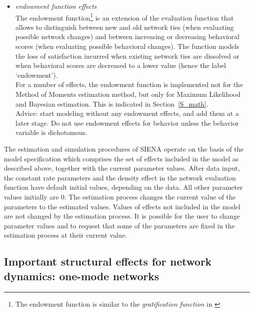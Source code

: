 \documentclass[a4paper,fleqn]{article}
\newcommand{\+}{\, + \,}
\newcommand{\SI}{{\sf SIENA }}
\begin{document}
{\begin{itemize}
density. For directed networks,
it mostly is also advisable to include the reciprocity
effect, this being one of the most fundamental network effects.
Likewise, behavior evaluation functions should normally always
contain the shape parameter, to account for the observed
prevalence of the behavior, and
(unless the behavior is dichotomous) the quadratic shape effect,
to account more precisely for the distribution of the behavior.
\item {\em endowment function effects}\\
The endowment function\footnote{The endowment function is similar to the {\it gratification
function} in \citet{Snijders01}} is an extension of the evaluation
function that allows to distinguish between new and old network
ties (when evaluating possible network changes) and between
increasing or decreasing behavioral scores (when evaluating
possible behavioral changes). The function models the loss of
satisfaction incurred when existing network ties are dissolved or
when behavioral scores
are decreased to a lower value (hence the label `endowment').\\
For a number of effects, the endowment function is implemented
not for the Method of Moments estimation method,
but only for Maximum Likelihood and Bayesian estimation.
This is indicated in Section~\ref{S_math}.\\
Advice: start modeling without any endowment effects,
and add them at a later stage.
Do not use endowment effects for behavior unless
the behavior variable is dichotomous.
\end{itemize}

The estimation and simulation procedures of \SI operate on the basis
of the model specification which comprises the set of
effects included in the model as described above,
together with the current
parameter values.
After data input, the constant rate
parameters and the density effect in the network evaluation function
have default initial values, depending on the data. All other
parameter values initially are 0. The estimation process changes
the current value of the parameters to the estimated values.
Values of effects not included in the model are not changed by the
estimation process. It is possible for the user to change
parameter values and to request that some of the parameters are
fixed in the estimation process at their current value.

\subsection{Important structural effects for network dynamics:
           \protect\newline one-mode networks}
\label{S_imp_str1}

}
\end{document}
